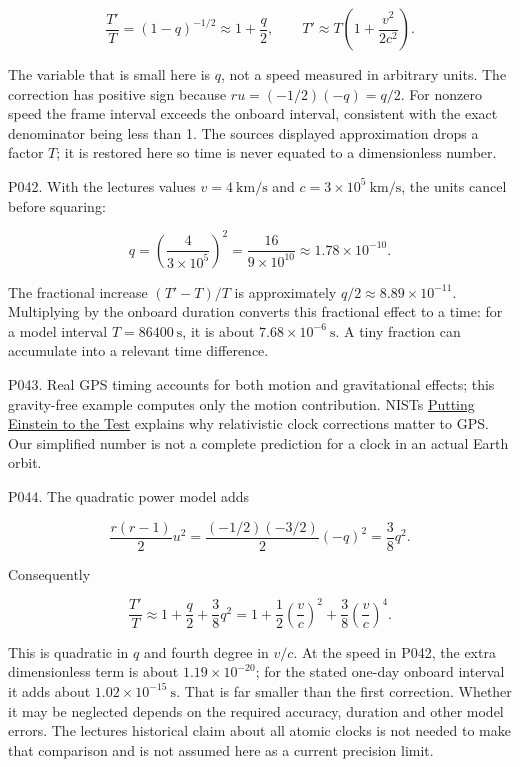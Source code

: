 \documentclass[
  11pt,
]{article}
\begin{document}
\[
\frac{T'}T=(1-q)^{-1/2}\approx1+\frac q2,
\qquad T'\approx T\left(1+\frac{v^2}{2c^2}\right).
\]

The variable that is small here is \(q\), not a speed measured in
arbitrary units. The correction has positive sign because
\(ru=(-1/2)(-q)=q/2\). For nonzero speed the frame interval exceeds the
onboard interval, consistent with the exact denominator being less than
1. The source\textquotesingle s displayed approximation drops a factor
\(T\); it is restored here so time is never equated to a dimensionless
number.

P042. With the lecture\textquotesingle s values \(v=4\ \mathrm{km/s}\)
and \(c=3\times10^5\ \mathrm{km/s}\), the units cancel before squaring:

\[
q=\left(\frac{4}{3\times10^5}\right)^2
=\frac{16}{9\times10^{10}}\approx1.78\times10^{-10}.
\]

The fractional increase \((T'-T)/T\) is approximately
\(q/2\approx8.89\times10^{-11}\). Multiplying by the onboard duration
converts this fractional effect to a time: for a model interval
\(T=86400\ \mathrm{s}\), it is about \(7.68\times10^{-6}\ \mathrm{s}\).
A tiny fraction can accumulate into a relevant time difference.

P043. Real GPS timing accounts for both motion and gravitational
effects; this gravity-free example computes only the motion
contribution. NIST\textquotesingle s
\href{https://www.nist.gov/atomic-clocks/a-powerful-tool-for-science/putting-einstein-test}{Putting
Einstein to the Test} explains why relativistic clock corrections matter
to GPS. Our simplified number is not a complete prediction for a clock
in an actual Earth orbit.

P044. The quadratic power model adds

\[
\frac{r(r-1)}2u^2=\frac{(-1/2)(-3/2)}2(-q)^2=\frac38q^2.
\]

Consequently

\[
\frac{T'}T\approx1+\frac q2+\frac38q^2
=1+\frac12\left(\frac vc\right)^2+\frac38\left(\frac vc\right)^4.
\]

This is quadratic in \(q\) and fourth degree in \(v/c\). At the speed in
P042, the extra dimensionless term is about \(1.19\times10^{-20}\); for
the stated one-day onboard interval it adds about
\(1.02\times10^{-15}\ \mathrm{s}\). That is far smaller than the first
correction. Whether it may be neglected depends on the required
accuracy, duration and other model errors. The lecture\textquotesingle s
historical claim about all atomic clocks is not needed to make that
comparison and is not assumed here as a current precision limit.
\end{document}
